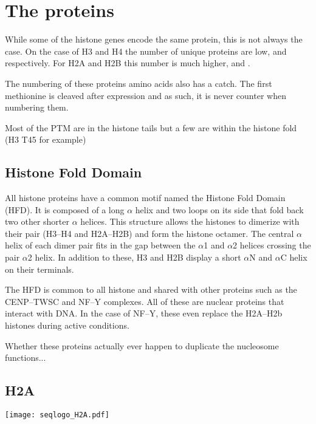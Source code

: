 \section{The proteins}
  While some of the histone genes encode the same protein, this is not always the
  case. On the case of H3 and H4 the number of unique proteins are low, \HThreeUniqueProteins{}
  and \HFourUniqueProteins{} respectively. For H2A and H2B this number is much higher, \HTwoAUniqueProteins{}
  and \HTwoBUniqueProteins{}.

  The numbering of these proteins amino acids also has a catch. The first methionine
  is cleaved after expression and as such, it is never counter when numbering them.

  Most of the PTM are in the histone tails but a few are within the histone fold (H3 T45 for example)

  \subsection{Histone Fold Domain}

    All histone proteins have a common motif named the Histone Fold Domain (HFD).
    It is composed of a long $\alpha$ helix and two loops on its side that fold
    back two other shorter $\alpha$ helices. This structure allows the histones
    to dimerize with their pair (H3--H4 and H2A--H2B) and form the histone
    octamer. The central $\alpha$ helix of each dimer pair fits in the gap between
    the $\alpha$1 and $\alpha$2 helices crossing the pair $\alpha$2 helix. In
    addition to these, H3 and H2B display a short $\alpha$N and $\alpha$C helix
    on their terminals.

    The HFD is common to all histone and shared with other
    proteins such as the CENP--TWSC and NF--Y complexes. All of these are nuclear
    proteins that interact with DNA. In the case of NF--Y, these even replace
    the H2A--H2b histones during active conditions.

    Whether these proteins actually ever happen to duplicate the nucleosome functions...


  \subsection{H2A}
    \begin{TableAndFigure*}
      \label{tab:H2A-consensus}
      

      \texttt{[image: seqlogo\_H2A.pdf]}
      \label{fig:H2A-weblogo}
    \end{TableAndFigure*}

